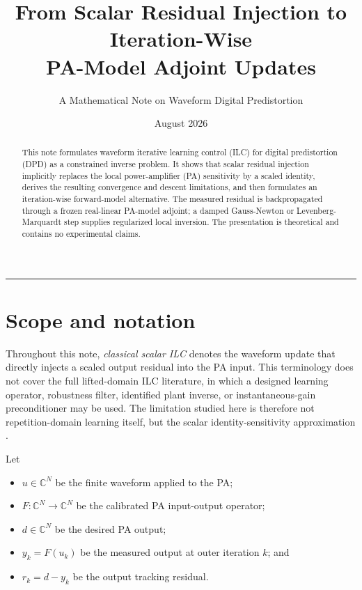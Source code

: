 \documentclass[10pt,a4paper]{article}
\title{\vspace{-1.2cm}\color{TitleBlue}\bfseries
  From Scalar Residual Injection to Iteration-Wise\\[0.18em]
  PA-Model Adjoint Updates}
\author{\large A Mathematical Note on Waveform Digital Predistortion}
\date{August 2026}
\begin{document}
\maketitle
\vspace{-1.2em}
\begin{center}
  \color{RuleGray}\rule{0.84\textwidth}{0.7pt}
\end{center}

\begin{abstract}
This note formulates waveform iterative learning control (ILC) for digital predistortion (DPD) as a
constrained inverse problem. It shows that scalar residual injection implicitly replaces the local
power-amplifier (PA) sensitivity by a scaled identity, derives the resulting convergence and descent
limitations, and then formulates an iteration-wise forward-model alternative. The measured residual is
backpropagated through a frozen real-linear PA-model adjoint; a damped Gauss-Newton or
Levenberg-Marquardt step supplies regularized local inversion. The presentation is theoretical and
contains no experimental claims.
\end{abstract}

\tableofcontents
\vspace{0.4em}

\section{Scope and notation}

Throughout this note, \emph{classical scalar ILC} denotes the waveform update that directly injects a
scaled output residual into the PA input. This terminology does not cover the full lifted-domain ILC
literature, in which a designed learning operator, robustness filter, identified plant inverse, or
instantaneous-gain preconditioner may be used. The limitation studied here is therefore not repetition-domain
learning itself, but the scalar identity-sensitivity approximation
\cite{chani2016ilc,schoukens2017preinverse}.

Let
\begin{itemize}
  \item $u\in\mathbb C^N$ be the finite waveform applied to the PA;
  \item $F:\mathbb C^N\rightarrow\mathbb C^N$ be the calibrated PA input-output operator;
  \item $d\in\mathbb C^N$ be the desired PA output;
  \item $y_k=F(u_k)$ be the measured output at outer iteration $k$; and
  \item $r_k=d-y_k$ be the output tracking residual.
\end{itemize}
\end{document}
